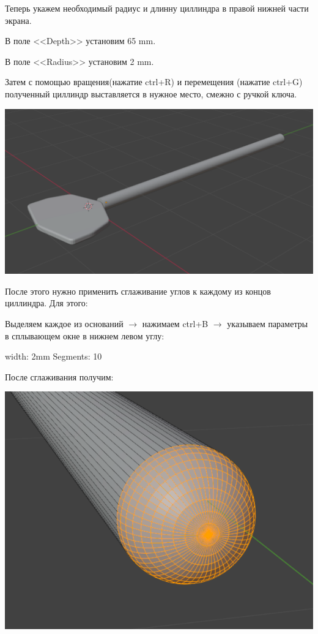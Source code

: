 \documentclass[12pt]{article}
\begin{document}
\begin{enumerate}
Теперь укажем необходимый радиус и длинну циллиндра в правой нижней части экрана.

В поле <<Depth>> установим 65 mm.

В поле <<Radius>> установим 2 mm.

Затем с помощью вращения(нажатие ctrl+R) и перемещения (нажатие ctrl+G)   полученный циллиндр выставляется в нужное место, смежно с ручкой ключа.

\vskip 1cm
{
    \centering
    \includegraphics[width=1\linewidth]{cyl2.png}
    \label{fig:i1}
}
\vskip 1cm

После этого нужно применить сглаживание углов к каждому из концов циллиндра. Для этого:

Выделяем каждое из оснований $\to $ нажимаем ctrl+B  $\to $ указываем параметры в сплывающем окне в нижнем левом углу:

width: 2mm
Segments: 10

После сглаживания получим:

\vskip 1cm
{
    \centering
    \includegraphics[width=0.8\linewidth]{3cyl3.png}
    \label{fig:i1}
}
\vskip 1cm



\end{enumerate}
\end{document}
